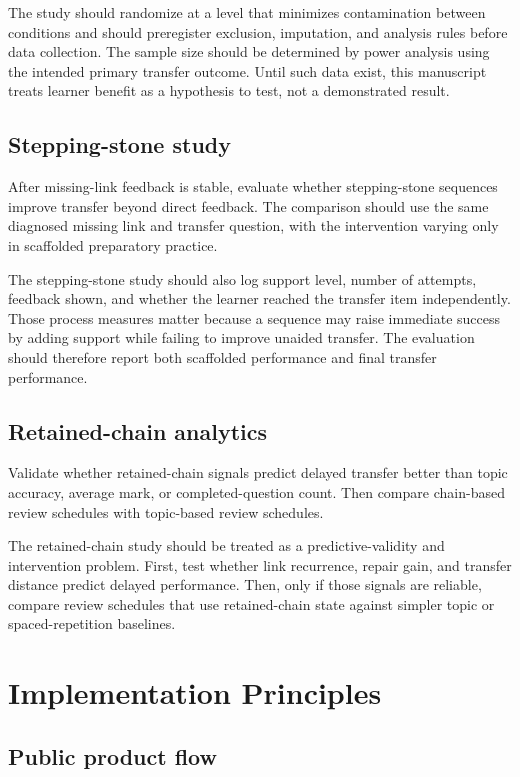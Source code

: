 \documentclass[11pt]{article}
\begin{document}
The study should randomize at a level that minimizes contamination between conditions and should preregister exclusion, imputation, and analysis rules before data collection. The sample size should be determined by power analysis using the intended primary transfer outcome. Until such data exist, this manuscript treats learner benefit as a hypothesis to test, not a demonstrated result.

\subsection{Stepping-stone study}

After missing-link feedback is stable, evaluate whether stepping-stone sequences improve transfer beyond direct feedback. The comparison should use the same diagnosed missing link and transfer question, with the intervention varying only in scaffolded preparatory practice.

The stepping-stone study should also log support level, number of attempts, feedback shown, and whether the learner reached the transfer item independently. Those process measures matter because a sequence may raise immediate success by adding support while failing to improve unaided transfer. The evaluation should therefore report both scaffolded performance and final transfer performance.

\subsection{Retained-chain analytics}

Validate whether retained-chain signals predict delayed transfer better than topic accuracy, average mark, or completed-question count. Then compare chain-based review schedules with topic-based review schedules.

The retained-chain study should be treated as a predictive-validity and intervention problem. First, test whether link recurrence, repair gain, and transfer distance predict delayed performance. Then, only if those signals are reliable, compare review schedules that use retained-chain state against simpler topic or spaced-repetition baselines.

\section{Implementation Principles}

\subsection{Public product flow}
\end{document}
